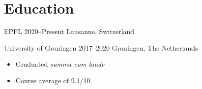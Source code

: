 \section*{Education}

{EPFL} %
{2020--Present} %
{Lausanne, Switzerland} %

{University of Groningen} %
{2017--2020} %
{Groningen, The Netherlands} %
{%
  \vspace{-0.8em}
  \begin{itemize}
    \item Graduated \textit{summa cum laude}
    \item Course average of 9.1/10
  \end{itemize}
}
